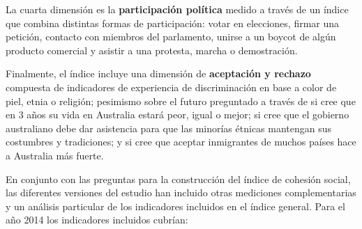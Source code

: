 \documentclass[
  12pt,
]{book}
\begin{document}
La cuarta dimensión es la \textbf{participación política} medido a través de
un índice que combina distintas formas de participación: votar en
elecciones, firmar una petición, contacto con miembros del parlamento,
unirse a un boycot de algún producto comercial y asistir a una protesta,
marcha o demostración.

Finalmente, el índice incluye una dimensión de \textbf{aceptación y rechazo}
compuesta de indicadores de experiencia de discriminación en base a
color de piel, etnia o religión; pesimismo sobre el futuro preguntado a
través de si cree que en 3 años su vida en Australia estará peor, igual
o mejor; si cree que el gobierno australiano debe dar asistencia para
que las minorías étnicas mantengan sus costumbres y tradiciones; y si
cree que aceptar inmigrantes de muchos países hace a Australia más
fuerte. \citep{colic-peisker_Social_2015}

En conjunto con las preguntas para la construcción del índice de
cohesión social, las diferentes versiones del estudio han incluido otras
mediciones complementarias y un análisis particular de los indicadores
incluidos en el índice general. Para el año 2014 los indicadores
incluidos cubrían:
\end{document}
